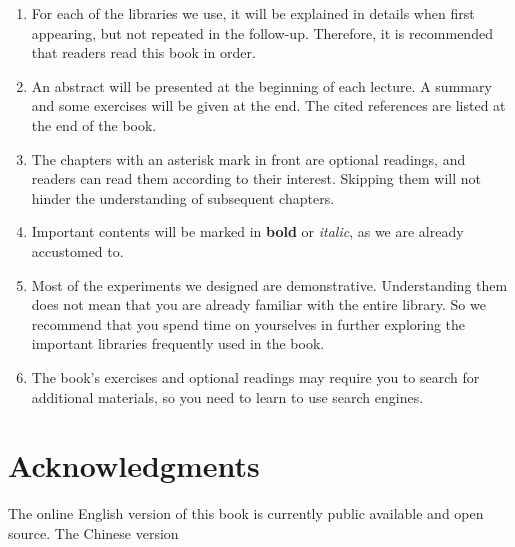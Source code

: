 \begin{enumerate}
	\item For each of the libraries we use, it will be explained in details when first appearing, but not repeated in the follow-up. Therefore, it is recommended that readers read this book in order.
	
	\item An abstract will be presented at the beginning of each lecture. A summary and some exercises will be given at the end. The cited references are listed at the end of the book.

	\item The chapters with an asterisk mark in front are optional readings, and readers can read them according to their interest. Skipping them will not hinder the understanding of subsequent chapters.
	
	\item Important contents will be marked in \textbf{bold} or \emph{italic}, as we are already accustomed to.

	\item Most of the experiments we designed are demonstrative. Understanding them does not mean that you are already familiar with the entire library. So we recommend that you spend time on yourselves in further exploring the important libraries frequently used in the book.

	\item The book's exercises and optional readings may require you to search for additional materials, so you need to learn to use search engines.
\end{enumerate}

\section{Acknowledgments}
The online English version of this book is currently public available and open source. The Chinese version


